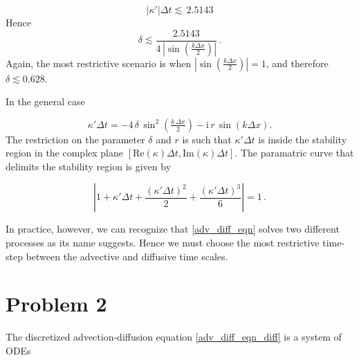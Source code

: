 \documentclass[11pt]{article}
\newcommand{\ii}{\mathrm{i}}
\def\beq{\begin{equation}}
\def\eeq{\end{equation}}
\begin{document}
\begin{enumerate}[label=(\alph*)]
    \beq
    |\kappa'| \Delta t \lesssim \, 2.5143
    \eeq
    Hence
    \beq
    \delta \lesssim \frac{2.5143}{4 \, |\sin\left(\tfrac{k \Delta x}{2}\right)|}\,.
    \eeq
    Again, the most restrictive scenario is when  $ |\sin\left(\tfrac{k \Delta x}{2}\right)| = 1$, and therefore $\boxed{\delta \lesssim 0.628}$.

    In the general case

    \beq
        \kappa' \Delta t = - 4 \, \delta \, \sin^2{\left(\tfrac{k \, \Delta x}{2}\right)}  -  \ii \, r \,\sin{\left(k\Delta x\right)}. 
    \eeq
    The restriction on the parameter $\delta$ and $r$ is such that $\kappa' \Delta t$ is inside the stability region in the complex plane $\left[\text{Re}(\kappa)\Delta t,\text{Im}(\kappa)\Delta t \right]$. The paramatric curve that delimits the stability region is given by

    \beq
    \left|1 + \kappa' \Delta t + \frac{(\kappa' \Delta t)^2}{2} + \frac{(\kappa' \Delta t)^3}{6}\right| = 1\, .
    \eeq

    In practice, however,  we can recognize that \eqref{adv_diff_eqn} solves two different processes as its name suggests. Hence we must choose the most restrictive time-step between the advective and diffusive time scales.




\end{enumerate}        

\section*{Problem 2}

The discretized advection-diffusion equation  \eqref{adv_diff_eqn_diff} is a system of ODEs
\end{document}
